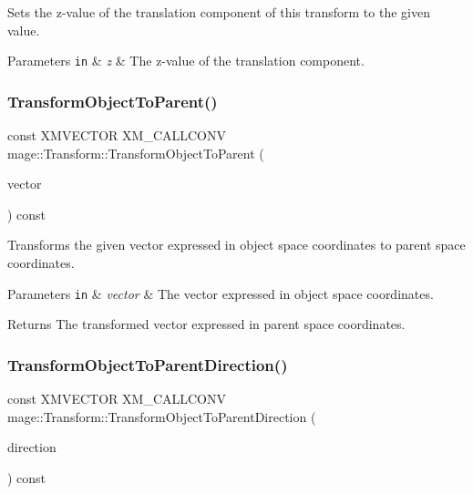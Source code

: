 Sets the z-\/value of the translation component of this transform to the given value.


\begin{DoxyParams}[1]{Parameters}
\mbox{\tt in}  & {\em z} & The z-\/value of the translation component. \\
\hline
\end{DoxyParams}
\hypertarget{classmage_1_1_transform_a622f8234d70768c33a3cbb8fa50932cc}{}\label{classmage_1_1_transform_a622f8234d70768c33a3cbb8fa50932cc} 
\subsubsection{\texorpdfstring{Transform\+Object\+To\+Parent()}{TransformObjectToParent()}}
{\footnotesize\ttfamily const X\+M\+V\+E\+C\+T\+OR X\+M\+\_\+\+C\+A\+L\+L\+C\+O\+NV mage\+::\+Transform\+::\+Transform\+Object\+To\+Parent (\begin{DoxyParamCaption}\item[{F\+X\+M\+V\+E\+C\+T\+OR}]{vector }\end{DoxyParamCaption}) const\hspace{0.3cm}{\ttfamily [noexcept]}}

Transforms the given vector expressed in object space coordinates to parent space coordinates.


\begin{DoxyParams}[1]{Parameters}
\mbox{\tt in}  & {\em vector} & The vector expressed in object space coordinates. \\
\hline
\end{DoxyParams}
\begin{DoxyReturn}{Returns}
The transformed vector expressed in parent space coordinates. 
\end{DoxyReturn}
\hypertarget{classmage_1_1_transform_afddbd41527257bf0ed20ceafa19b49c9}{}\label{classmage_1_1_transform_afddbd41527257bf0ed20ceafa19b49c9} 
\subsubsection{\texorpdfstring{Transform\+Object\+To\+Parent\+Direction()}{TransformObjectToParentDirection()}}
{\footnotesize\ttfamily const X\+M\+V\+E\+C\+T\+OR X\+M\+\_\+\+C\+A\+L\+L\+C\+O\+NV mage\+::\+Transform\+::\+Transform\+Object\+To\+Parent\+Direction (\begin{DoxyParamCaption}\item[{F\+X\+M\+V\+E\+C\+T\+OR}]{direction }\end{DoxyParamCaption}) const\hspace{0.3cm}{\ttfamily [noexcept]}}

